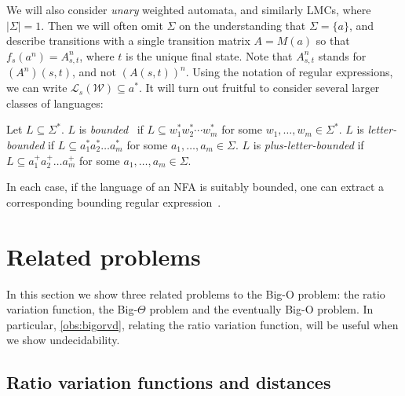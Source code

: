 \documentclass{lmcs}
\theoremstyle{plain}
\theoremstyle{definition}
\theoremstyle{remark}
\newcommand\lng[2]{\mathcal{L}_{#1}(#2)}
\newcommand\chr{a}
\newcommand\wa{\mathcal{W}}
\renewcommand\nu{f}
\begin{document}
We will also consider \textit{unary} weighted automata, and similarly LMCs, where $|\Sigma|=1$. Then we will often omit  $\Sigma$
on the understanding that $\Sigma=\{a\}$, and describe  transitions with a single transition matrix $A=M(a)$ so that $\nu_s(a^n) = A_{s,t}^n$, where $t$ is the unique final state. Note that $A^n_{s,t}$ stands for $(A^n)(s,t)$,
and not $(A(s,t))^n$. Using the notation of regular expressions, we can write $\lng{s}{\wa}\subseteq a^\ast$.  It will turn out fruitful to consider several larger classes of languages:

\begin{defi}\label{def:bounded}  \label{def:letter-bounded} \label{def:plus-letter-bounded}\begin{sloppypar}
Let $L\subseteq \Sigma^\ast$.
$L$ is \emph{bounded}~\cite{ginsburg1964bounded} if $L\subseteq w_1^\ast w_2^\ast \cdots w_m^\ast$
for some $w_1, \dots, w_m \in \Sigma^*$.
$L$ is \emph{letter-bounded} if $L\subseteq \chr_1^*\chr_2^*\dots \chr_m^*$ for some
$\chr_1,\dots,\chr_m\in \Sigma$.
$L$ is \emph{plus-letter-bounded} if $L\subseteq\chr_1^+\chr_2^+\dots \chr_m^+$ for some
$\chr_1,\dots,\chr_m\in \Sigma$.\end{sloppypar}
\end{defi}
In each case, if the language of an NFA is suitably bounded, one can extract a corresponding bounding  regular expression~\cite{GawrychowskiKRS10}.

\section{Related problems}

\label{sec:bigord}

In this section we show three related problems to the Big-O problem: the ratio variation function, the Big-$\Theta$ problem and the eventually Big-O problem. In particular, \cref{obs:bigorvd}, relating the ratio variation function, will be useful when we show undecidability.

\subsection{Ratio variation functions and distances}
\end{document}
